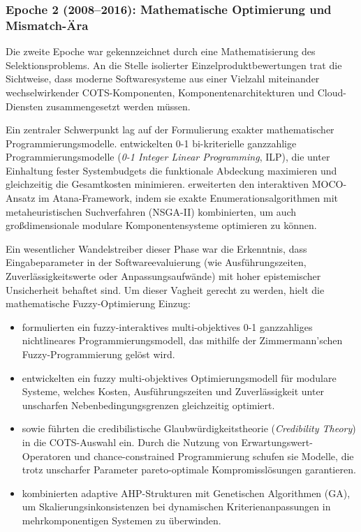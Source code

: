 \subsubsection{Epoche 2 (2008--2016): Mathematische Optimierung und Mismatch-Ära}

Die zweite Epoche war gekennzeichnet durch eine Mathematisierung des Selektionsproblems. An die Stelle isolierter Einzelproduktbewertungen trat die Sichtweise, dass moderne Softwaresysteme aus einer Vielzahl miteinander wechselwirkender COTS-Komponenten, Komponentenarchitekturen und Cloud-Diensten zusammengesetzt werden müssen.

Ein zentraler Schwerpunkt lag auf der Formulierung exakter mathematischer Programmierungsmodelle. \cite{VUVLUN85} entwickelten 0-1 bi-kriterielle ganzzahlige Programmierungsmodelle (\textit{0-1 Integer Linear Programming}, ILP), die unter Einhaltung fester Systembudgets die funktionale Abdeckung maximieren und gleichzeitig die Gesamtkosten minimieren. \cite{MZ8JHDYA} erweiterten den interaktiven MOCO-Ansatz im Atana-Framework, indem sie exakte Enumerationsalgorithmen mit metaheuristischen Suchverfahren (NSGA-II) kombinierten, um auch großdimensionale modulare Komponentensysteme optimieren zu können.

Ein wesentlicher Wandelstreiber dieser Phase war die Erkenntnis, dass Eingabeparameter in der Softwareevaluierung (wie Ausführungszeiten, Zuverlässigkeitswerte oder Anpassungsaufwände) mit hoher epistemischer Unsicherheit behaftet sind. Um dieser Vagheit gerecht zu werden, hielt die mathematische Fuzzy-Optimierung Einzug:
\begin{itemize}
    \item \cite{6YJHIVHG} formulierten ein fuzzy-interaktives multi-objektives 0-1 ganzzahliges nichtlineares Programmierungsmodell, das mithilfe der Zimmermann'schen Fuzzy-Programmierung gelöst wird.
    \item \cite{P9SATBH5} entwickelten ein fuzzy multi-objektives Optimierungsmodell für modulare Systeme, welches Kosten, Ausführungszeiten und Zuverlässigkeit unter unscharfen Nebenbedingungsgrenzen gleichzeitig optimiert.
    \item \cite{JX4RDRDU} sowie \cite{B7ZTQCZZ} führten die credibilistische Glaubwürdigkeitstheorie (\textit{Credibility Theory}) in die COTS-Auswahl ein. Durch die Nutzung von Erwartungswert-Operatoren und chance-constrained Programmierung schufen sie Modelle, die trotz unscharfer Parameter pareto-optimale Kompromisslösungen garantieren.
    \item \cite{VRTXHQI7} kombinierten adaptive AHP-Strukturen mit Genetischen Algorithmen (GA), um Skalierungsinkonsistenzen bei dynamischen Kriterienanpassungen in mehrkomponentigen Systemen zu überwinden.
\end{itemize}


